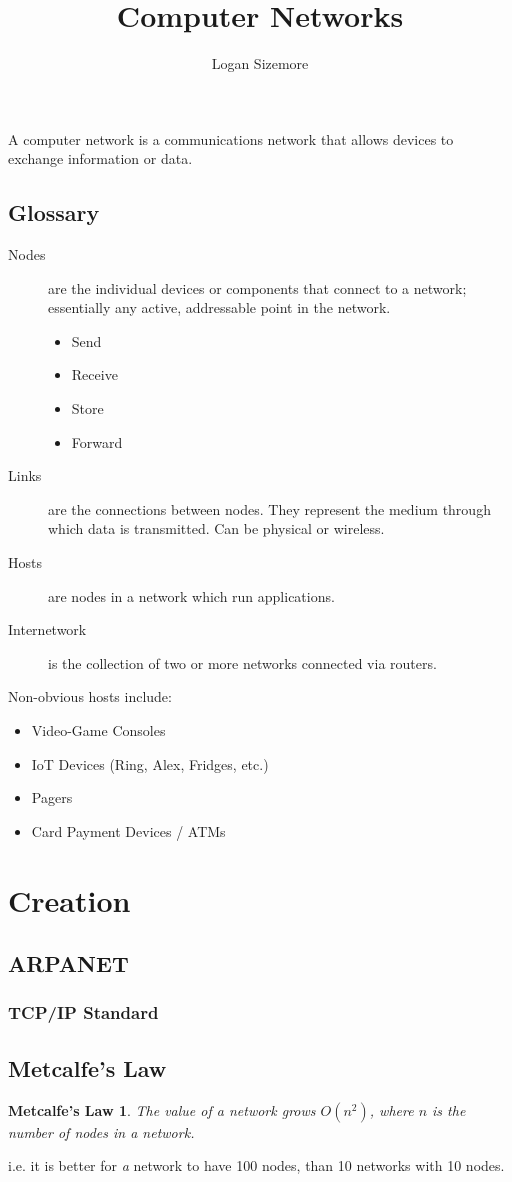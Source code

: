 \documentclass{article}
\title{Computer Networks}
\author{Logan Sizemore}
\begin{document}
\maketitle

A computer network is a communications network that allows devices to exchange
information or data.

\subsection{Glossary}

\begin{description}
    \item[Nodes]  are the individual devices or components that connect to a
          network; essentially any active, addressable point in the network.
          \begin{itemize}
              \item Send
              \item Receive
              \item Store
              \item Forward
          \end{itemize}
    \item[Links] are the connections between nodes. They represent the
          medium through which data is transmitted. Can be physical or wireless.
    \item[Hosts] are nodes in a network which run applications.
    \item[Internetwork] is the collection of two or more networks connected via routers.
\end{description}

\noindent
Non-obvious hosts include:
\begin{itemize}
    \item Video-Game Consoles
    \item IoT Devices (Ring, Alex, Fridges, etc.)
    \item Pagers
    \item Card Payment Devices / ATMs
\end{itemize}

\section{Creation}
\subsection{ARPANET}
\subsubsection{TCP/IP Standard}

\subsection{Metcalfe's Law}
\newtheorem{metcalfe}{Metcalfe's Law}

\begin{metcalfe}
    The value of a network grows \(O(n^2)\), where $n$ is the number of nodes in
    a network.
\end{metcalfe}

i.e. it is better for \emph{a} network to have 100 nodes, than 10 networks with
10 nodes.
\end{document}
